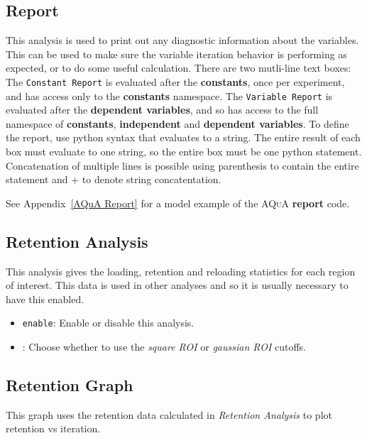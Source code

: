 \documentclass[pdftex,11pt,letterpaper]{article}
\begin{document}
\subsection{Report}

This analysis is used to print out any diagnostic information about the variables.  This can be used to make sure the variable iteration behavior is performing as expected, or to do some useful calculation.  There are two mutli-line text boxes:  The \texttt{Constant Report} is evaluated after the \textbf{constants}, once per experiment, and has access only to the \textbf{constants} namespace.  The \texttt{Variable Report} is evaluated after the \textbf{dependent variables}, and so has access to the full namespace of \textbf{constants}, \textbf{independent} and \textbf{dependent variables}.  To define the report, use python syntax that evaluates to a string.  The entire result of each box must evaluate to one string, so the entire box must be one python statement.  Concatenation of multiple lines is possible using parenthesis to contain the entire statement and + to denote string concatentation.

See Appendix~\ref{AQuA Report} for a model example of the \textsc{AQuA} \textbf{report} code.

\subsection{Retention Analysis}

This analysis gives the loading, retention and reloading statistics for each region of interest.  This data is used in other analyses and so it is usually necessary to have this enabled.

\begin{itemize}
\item \texttt{enable}:  Enable or disable this analysis.
\item {}:  Choose whether to use the \textit{square ROI} or \textit{gaussian ROI} cutoffs.
\end{itemize}

\subsection{Retention Graph}

This graph uses the retention data calculated in \textit{Retention Analysis} to plot retention vs iteration.
\end{document}
